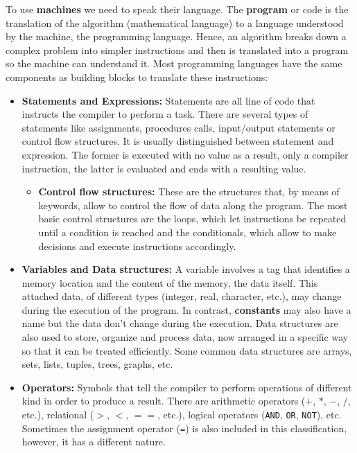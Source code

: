 To use \textbf{machines} we need to speak their language.
The \textbf{program} or code is the translation of the algorithm (mathematical language) 
to a language understood by the machine, the programming language. 
Hence, 
an algorithm breaks down a complex problem into simpler instructions 
and then is translated into a program so the machine can understand it. 
Most programming languages have the same components as building blocks to translate these instructions:
\begin{itemize}[noitemsep]
    \item \textbf{Statements and Expressions:} Statements are all line of code that instructs the compiler to perform a task.
    There are several types of statements like assignments, procedures calls, input/output statements or control flow structures. 
    It is usually distinguished between statement and expression. 
    The former is executed with no value as a result, only a compiler instruction, 
    the latter is evaluated and ends with a resulting value.
    \begin{itemize}
        \item \textbf{Control flow structures:} These are the structures that, by means of keywords, allow to control the flow of data along the program. 
        The most basic control structures are the loops, which let instructions be repeated until a condition is reached and 
        the conditionals, which allow to make decisions and execute instructions accordingly.  
    \end{itemize}
    
    \item \textbf{Variables and Data structures:} A variable involves a tag that identifies a memory location and 
    the content of the memory, the data itself. 
    This attached data, of different types (integer, real, character, etc.), may change during the execution of the program.
    In contrast, \textbf{constants} may also have a name but the data don't change during the execution.
    Data structures are also used to store, organize and process data, 
    now arranged in a specific way so that it can be treated efficiently. 
    Some common data structures are arrays, sets, lists, tuples, trees, graphs, etc.
    
    \item \textbf{Operators:} Symbols that tell the compiler to perform operations of different kind in order to produce a result.
    There are arithmetic operators ($+$, $*$, $-$, $/$, etc.), 
    relational ($>$, $<$, $==$, etc.), 
    logical operators (\texttt{AND}, \texttt{OR}, \texttt{NOT}), etc. 
    Sometimes the assignment operator (\texttt{=}) is also included in this classification, 
    however, it has a different nature. 
    

\end{itemize}
